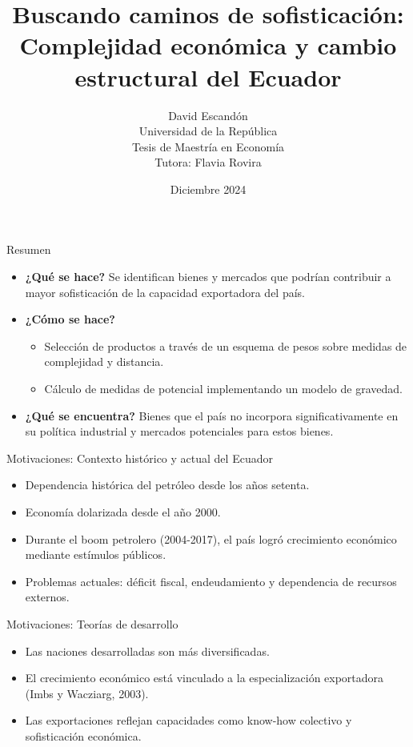 \documentclass{beamer}
\title{Buscando caminos de sofisticación: Complejidad económica y cambio estructural del Ecuador}
\author{David Escandón \\ Universidad de la República \\ Tesis de Maestría en Economía \\ Tutora: Flavia Rovira}
\date{Diciembre 2024}
\begin{document}
\begin{frame}
    \titlepage
\end{frame}

\begin{frame}{Resumen}
    \begin{itemize}
        \item \textbf{¿Qué se hace?} Se identifican bienes y mercados que podrían contribuir a mayor sofisticación de la capacidad exportadora del país.
        \item \textbf{¿Cómo se hace?}
        \begin{itemize}
            \item Selección de productos a través de un esquema de pesos sobre medidas de complejidad y distancia.
            \item Cálculo de medidas de potencial implementando un modelo de gravedad.
        \end{itemize}
        \item \textbf{¿Qué se encuentra?} Bienes que el país no incorpora significativamente en su política industrial y mercados potenciales para estos bienes.
    \end{itemize}
\end{frame}

\begin{frame}{Motivaciones: Contexto histórico y actual del Ecuador}
    \begin{itemize}
        \item Dependencia histórica del petróleo desde los años setenta.
        \item Economía dolarizada desde el año 2000.
        \item Durante el boom petrolero (2004-2017), el país logró crecimiento económico mediante estímulos públicos.
        \item Problemas actuales: déficit fiscal, endeudamiento y dependencia de recursos externos.
    \end{itemize}
\end{frame}

\begin{frame}{Motivaciones: Teorías de desarrollo}
    \begin{itemize}
        \item Las naciones desarrolladas son más diversificadas.
        \item El crecimiento económico está vinculado a la especialización exportadora (Imbs y Wacziarg, 2003).
        \item Las exportaciones reflejan capacidades como know-how colectivo y sofisticación económica.
    \end{itemize}
\end{frame}
\end{document}
